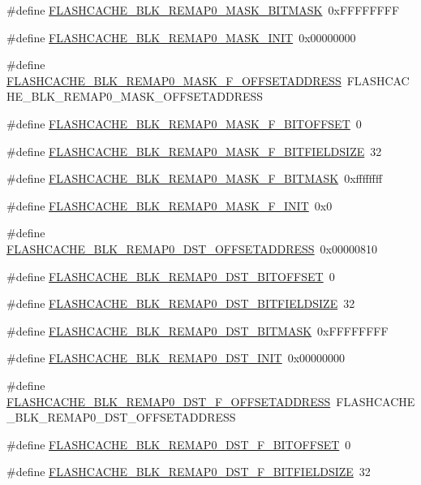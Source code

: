 \begin{DoxyCompactItemize}
\item 
\#define \hyperlink{a00550_ab1c1385fef6ca3e0f4fac60c6bf0b15f}{FLASHCACHE\_\-BLK\_\-REMAP0\_\-MASK\_\-BITMASK}~0xFFFFFFFF
\item 
\#define \hyperlink{a00550_a3b09218eff801a68200ebad589967ed4}{FLASHCACHE\_\-BLK\_\-REMAP0\_\-MASK\_\-INIT}~0x00000000
\item 
\#define \hyperlink{a00550_a112b645de35869fda85c8637c9575a7f}{FLASHCACHE\_\-BLK\_\-REMAP0\_\-MASK\_\-F\_\-OFFSETADDRESS}~FLASHCACHE\_\-BLK\_\-REMAP0\_\-MASK\_\-OFFSETADDRESS
\item 
\#define \hyperlink{a00550_a5dee774afd74d061185ca3f150d4969d}{FLASHCACHE\_\-BLK\_\-REMAP0\_\-MASK\_\-F\_\-BITOFFSET}~0
\item 
\#define \hyperlink{a00550_a2adc593ed12aaa34c74bd85baec00eab}{FLASHCACHE\_\-BLK\_\-REMAP0\_\-MASK\_\-F\_\-BITFIELDSIZE}~32
\item 
\#define \hyperlink{a00550_a350564bd744d59f58cfc9a27639f0ffe}{FLASHCACHE\_\-BLK\_\-REMAP0\_\-MASK\_\-F\_\-BITMASK}~0xffffffff
\item 
\#define \hyperlink{a00550_a5c50924ecce837b7dacddee2d455e7ef}{FLASHCACHE\_\-BLK\_\-REMAP0\_\-MASK\_\-F\_\-INIT}~0x0
\item 
\#define \hyperlink{a00550_ac0b3e1ee588ad8b9d11b25545fd9c3c3}{FLASHCACHE\_\-BLK\_\-REMAP0\_\-DST\_\-OFFSETADDRESS}~0x00000810
\item 
\#define \hyperlink{a00550_ac3c1a3c2b7636db9282094bedcfccc90}{FLASHCACHE\_\-BLK\_\-REMAP0\_\-DST\_\-BITOFFSET}~0
\item 
\#define \hyperlink{a00550_a87b5365f37149069eab778edf93d399e}{FLASHCACHE\_\-BLK\_\-REMAP0\_\-DST\_\-BITFIELDSIZE}~32
\item 
\#define \hyperlink{a00550_af6899d5e12e2764b089b4b30fecd632d}{FLASHCACHE\_\-BLK\_\-REMAP0\_\-DST\_\-BITMASK}~0xFFFFFFFF
\item 
\#define \hyperlink{a00550_aa9d24850915fe88f798941d98d19c20b}{FLASHCACHE\_\-BLK\_\-REMAP0\_\-DST\_\-INIT}~0x00000000
\item 
\#define \hyperlink{a00550_a93949f57bc425207d2d04af8e2507802}{FLASHCACHE\_\-BLK\_\-REMAP0\_\-DST\_\-F\_\-OFFSETADDRESS}~FLASHCACHE\_\-BLK\_\-REMAP0\_\-DST\_\-OFFSETADDRESS
\item 
\#define \hyperlink{a00550_ad48752ebdea4aab5f4b4e063d552f32f}{FLASHCACHE\_\-BLK\_\-REMAP0\_\-DST\_\-F\_\-BITOFFSET}~0
\item 
\#define \hyperlink{a00550_aa4401c12862c6bda95ddd8bc7b444409}{FLASHCACHE\_\-BLK\_\-REMAP0\_\-DST\_\-F\_\-BITFIELDSIZE}~32

\end{DoxyCompactItemize}
